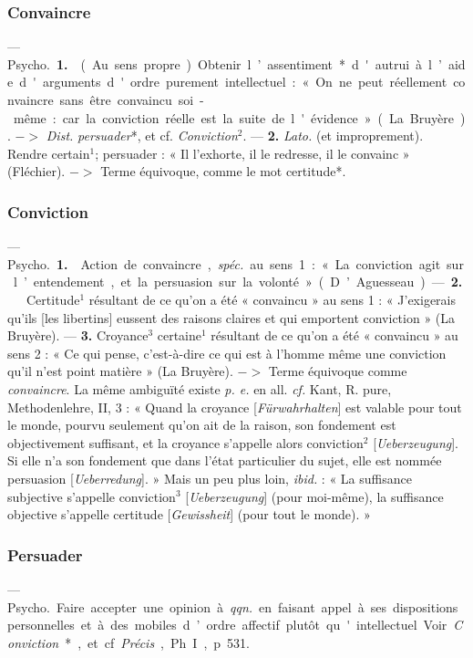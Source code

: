 \subsubsection{Convaincre}
 — \si{Psycho.} {\bf 1.}  (Au sens
propre). Obtenir l’assentiment*
d'autrui à l’aide d'arguments d'ordre
purement intellectuel : « On ne peut
réellement convaincre sans être
convaincu soi-même: car la conviction réelle est la suite de l'évidence »
(La Bruyère). $->$ {\it Dist.} {\it persuader}*,
et cf. {\it Conviction}$^2$. — {\bf 2.} {\it Lato.} (et
improprement).  Rendre certain$^1$;
persuader : « Il l’exhorte, il le redresse, il le convainc » (Fléchier).
$->$ Terme équivoque, comme le
mot certitude*.

\subsubsection{Conviction}
 — \si{Psycho.} {\bf 1.}  Action de
convaincre,  {\it spéc.} au sens 1 : « La
conviction agit sur l’entendement,
et la persuasion sur la volonté »
(D’Aguesseau). — {\bf 2.}   Certitude$^1$
résultant de ce qu’on a été « convaincu » au sens 1 : « J’exigerais
qu'ils [les libertins] eussent des raisons claires et qui emportent conviction » (La Bruyère). — {\bf 3.}  
Croyance$^3$ certaine$^1$ résultant de ce
qu’on a été « convaincu » au sens 2 :
« Ce qui pense, c’est-à-dire ce qui
est à l’homme même une conviction
qu’il n’est point matière » (La
Bruyère). $->$ Terme équivoque
comme {\it convaincre}. La même ambiguïté existe {\it p. e.} en all. {\it cf.} Kant,
R. pure, Methodenlehre, II, 3 :
« Quand la croyance [{\it Fürwahrhalten}] est valable pour tout le monde,
pourvu seulement qu’on ait de la
raison, son fondement est objectivement suffisant, et la croyance
s’appelle alors conviction$^2$ [{\it Ueberzeugung}]. Si elle n’a son fondement
que dans l’état particulier du sujet,
elle est nommée persuasion [{\it Ueberredung}]. » Mais un peu plus loin, {\it ibid.} :
« La suffisance subjective s'appelle
conviction$^3$ [{\it Ueberzeugung}] (pour
moi-même), la suffisance objective
s’appelle certitude [{\it Gewissheit}] (pour
tout le monde). »

\subsubsection{Persuader}
 — \si{Psycho.} Faire accepter une opinion à {\it qqn.} en
faisant appel à ses dispositions personnelles et à des mobiles d’ordre
affectif plutôt qu'intellectuel. Voir {\it Conviction}*, et cf. {\it Précis},
Ph. I, p. 531.

